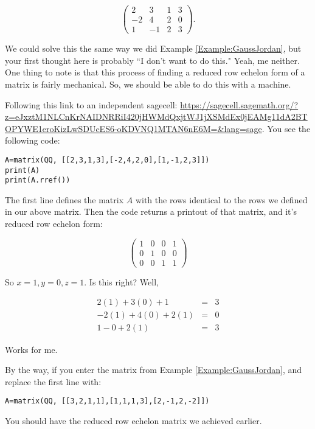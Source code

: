$$ \left( \begin{array}{rrr|r}
2 & 3 & 1& 3\\
-2 & 4 & 2 & 0\\
1 & -1 & 2 & 3
\end{array}\right).$$

We could solve this the same way we did Example \ref{Example:GaussJordan}, but your first thought here is probably ``I don't want to do this."  Yeah, me neither.  One thing to note is that this process of finding a reduced row echelon form of a matrix is fairly mechanical.  So, we should be able to do this with a machine.

Following this link to an independent sagecell:  \url{https://sagecell.sagemath.org/?z=eJxztM1NLCnKrNAIDNRRiI420jHWMdQxjtWJ1jXSMdEx0jEAMg11dA2BTOPYWE1eroKizLwSDUcES6-oKDVNQ1MTAN6nE6M=&lang=sage}.  You see the following code:

\begin{verbatim}
A=matrix(QQ, [[2,3,1,3],[-2,4,2,0],[1,-1,2,3]])
print(A)
print(A.rref())
\end{verbatim}

The first line defines the matrix $A$ with the rows identical to the rows we defined in our above matrix.  Then the code returns a printout of that matrix, and it's reduced row echelon form:


$$ \left( \begin{array}{rrr|r}
1 & 0 & 0& 1\\
0 & 1 & 0 & 0\\
0 & 0 & 1 & 1
\end{array}\right)$$

So $x=1, y=0, z=1$.  Is this right?  Well, 

\begin{eqnarray*}
2(1)+3(0)+1&=&3\\
-2(1)+4(0)+2(1)&=&0\\
1-0+2(1)&=&3
\end{eqnarray*}

Works for me.

By the way, if you enter the matrix from Example \ref{Example:GaussJordan}, and replace the first line with:

\begin{verbatim}
A=matrix(QQ, [[3,2,1,1],[1,1,1,3],[2,-1,2,-2]])
\end{verbatim}

You should have the reduced row echelon matrix we achieved earlier.






